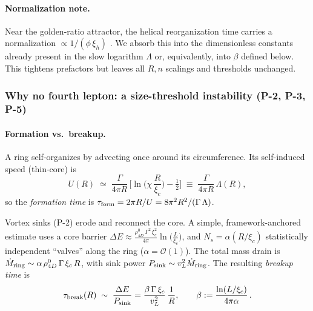 \paragraph*{Normalization note.}
Near the golden-ratio attractor, the helical reorganization time carries a normalization \(\propto 1/(\phi\,\xi_h)\) \cite{Norris2025GoldenRatio}. We absorb this into the dimensionless constants already present in the slow logarithm \(\Lambda\) or, equivalently, into \(\beta\) defined below. This tightens prefactors but leaves all \(R,n\) scalings and thresholds unchanged.

\subsubsection{Why no fourth lepton: a size-threshold instability (P-2, P-3, P-5)}
\paragraph{Formation vs.\ breakup.}
A ring self-organizes by advecting once around its circumference. Its self-induced speed (thin-core) is
\begin{equation}
U(R)\;\simeq\;\frac{\Gamma}{4\pi R}\,\Big[\ln\!\Big(\chi\,\frac{R}{\xi_c}\Big)-\tfrac12\Big]
\;\equiv\;\frac{\Gamma}{4\pi R}\,\Lambda(R),
\label{eq:U}
\end{equation}
so the \emph{formation time} is \(\tau_{\rm form}=2\pi R/U=8\pi^2R^2/(\Gamma\,\Lambda)\).

Vortex sinks (P-2) erode and reconnect the core. A simple, framework-anchored estimate uses a core barrier
\(
\Delta E \approx \frac{\rho_{4D}^0\,\Gamma^2\,\xi_c^2}{4\pi}\ln\!\big(\tfrac{L}{\xi_c}\big)
\),
and \(N_s=\alpha(R/\xi_c)\) statistically independent ``valves'' along the ring (\(\alpha=\mathcal O(1)\)). The total mass drain is
\(
\dot M_{\rm ring}\sim \alpha\,\rho_{4D}^0\,\Gamma\,\xi_c\,R
\),
with sink power \(P_{\rm sink}\sim v_L^2\dot M_{\rm ring}\). The resulting \emph{breakup time} is
\begin{equation}
\tau_{\rm break}(R)\;\sim\;\frac{\Delta E}{P_{\rm sink}}
=\frac{\beta\,\Gamma\,\xi_c}{v_L^2}\,\frac{1}{R},\qquad
\beta:=\frac{\ln(L/\xi_c)}{4\pi\alpha}\,.
\label{eq:taubreak}
\end{equation}

